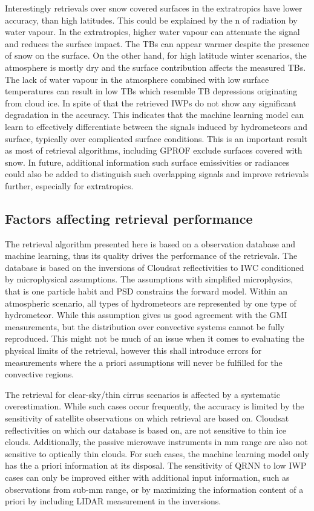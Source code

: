 \documentclass[amt, manuscript]{copernicus}
\begin{document}
Interestingly retrievals over snow covered surfaces in the extratropics have lower accuracy, than high latitudes. This could be explained by the n of radiation by water vapour. In the extratropics, higher water vapour can attenuate the signal and reduces the surface impact. The TBs can appear warmer despite the presence of snow on the surface.  On the other hand, for high latitude winter scenarios, the atmosphere is mostly dry and the surface contribution affects the measured TBs. The lack of water vapour in the atmosphere combined with low surface temperatures can result in low TBs which resemble TB depressions originating from cloud ice. In spite of that the retrieved IWPs do not show any significant degradation in the accuracy. This indicates that the machine learning model can learn to effectively differentiate between the signals induced by hydrometeors and surface, typically over complicated surface conditions. This is an important result as most of retrieval algorithms, including GPROF exclude surfaces covered with snow. In future, additional information such  surface emissivities or radiances could also be added to distinguish such overlapping signals and improve retrievals further, especially for extratropics.  


\subsection{Factors affecting retrieval performance}
%
The retrieval algorithm presented here is based on a observation database and machine learning, thus its quality drives the performance of the retrievals. The database is based on the inversions of Cloudsat reflectivities to IWC conditioned by microphysical assumptions. The assumptions with simplified microphysics, that is one particle habit and PSD constrains the forward model. Within an atmospheric scenario, all types of hydrometeors are represented by one type of hydrometeor. While this assumption gives us good agreement with the GMI measurements, but the distribution over convective systems cannot be fully reproduced. This might not be much of an issue when it comes to evaluating the physical limits of the retrieval, however this shall introduce errors for measurements where the a priori assumptions will never be fulfilled for the convective regions.

The retrieval for clear-sky/thin cirrus scenarios is affected by a systematic overestimation. While such cases occur frequently, the accuracy is limited by the sensitivity of satellite observations on which retrieval are based on. Cloudsat reflectivities on which our database is based on, are not sensitive to thin ice clouds. Additionally, the passive microwave instruments in mm range are also not sensitive to optically thin clouds. For such cases, the machine learning model only has the a priori information at its disposal. The sensitivity of QRNN to low IWP cases can only be improved either with additional input information, such as observations from sub-mm range, or by maximizing the information content of a priori by including LIDAR measurement in the inversions.
\end{document}
